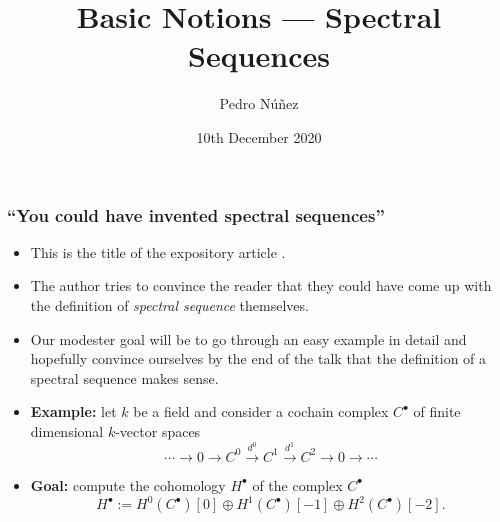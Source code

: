 \documentclass[notheorems, hyperref={backref}]{beamer}
\title[Basic Notions --- Spectral Sequences]{Basic Notions --- Spectral Sequences}
\author{Pedro Núñez}
\institute{University of Freiburg}
\date{10th December 2020}
\theoremstyle{darkgreentheorem}
\theoremstyle{darkbluedefinition}
\theoremstyle{darkredexample}
\theoremstyle{remark}
\newcommand{\op}{\oplus}
\begin{document}
 
\frame{\titlepage}

\begin{frame}
    \frametitle{``You could have invented spectral sequences''}
    \begin{itemize}
	\item This is the title of the expository article \cite{cho06}.
	    \pause
	\item The author tries to convince the reader that they could have come up with the definition of \textit{spectral sequence} themselves.
	    \pause
	\item Our modester goal will be to go through an easy example in detail and hopefully convince ourselves by the end of the talk that the definition of a spectral sequence makes sense.
	    \pause
	\item \textbf{Example:} let $k$ be a field and consider a cochain complex $C^{\bullet}$ of finite dimensional $k$-vector spaces
	    \[ \cdots \to 0\to C^{0}\xrightarrow{d^{0}} C^{1}\xrightarrow{d^{1}} C^{2}\to 0 \to \cdots \]
	    \pause
	    \vspace{-5mm}
	\item \textbf{Goal:} compute the cohomology $H^{\bullet}$ of the complex $C^{\bullet}$
	    \[ H^{\bullet}:=H^{0}(C^{\bullet})[0]\op H^{1}(C^{\bullet})[-1]\op H^{2}(C^{\bullet})[-2]. \]
    \end{itemize}
\end{frame}
\end{document}
